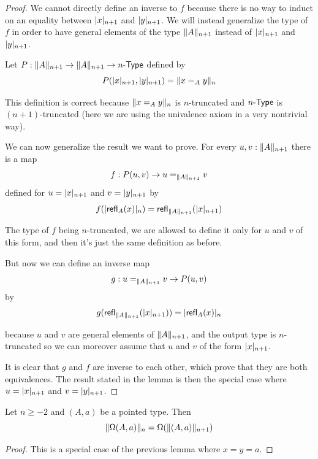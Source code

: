 \begin{proof}
  We cannot directly define an inverse to $f$ because there is no way to induct
  on an equality between $\tproj {n+1}x$ and $\tproj {n+1}y$. We will instead
  generalize the type of $f$ in order to have general elements of the type
  $\trunc{n+1}A$ instead of $\tproj {n+1}x$ and $\tproj {n+1}y$.

  Let $P:\trunc {n+1}A\to\trunc {n+1}A\to\typele{n}$ defined by
  \[P(\tproj {n+1}x,\tproj {n+1}y)=\trunc n{x=_Ay}\]

  This definition is correct because $\trunc n{x=_Ay}$ is $n$-truncated and
  $\typele{n}$ is $(n+1)$-truncated (here we are using the univalence axiom in a
  very nontrivial way).

  We can now generalize the result we want to prove. For every $u,v:\trunc{n+1}A$
  there is a map
  \[f:P(u,v)\to{}u=_{\trunc{n+1}A}v\]
  defined for $u=\tproj {n+1}x$ and $v=\tproj {n+1}y$ by
  \[f(\tproj n{\refl{A}(x)})=\refl{\trunc {n+1}A}(\tproj {n+1}x)\]

  The type of $f$ being $n$-truncated, we are allowed to define it only for $u$
  and $v$ of this form, and then it's just the same definition as before.

  But now we can define an inverse map
  \[g:u=_{\trunc{n+1}A}v\to{}P(u,v)\]
  by
  \[g(\refl{\trunc{n+1}A}(\tproj {n+1}x)) = \tproj n{\refl{A}(x)}\]

  because $u$ and $v$ are general elements of $\trunc{n+1}A$, and the output type
  is $n$-truncated so we can moreover assume that $u$ and $v$ of the form
  $\tproj {n+1}x$.

  It is clear that $g$ and $f$ are inverse to each other, which prove that they
  are both equivalences. The result stated in the lemma is then the special case
  where $u=\tproj {n+1}x$ and $v=\tproj {n+1}y$.
\end{proof}

\begin{cor}
  Let $n\ge-2$ and $(A,a)$ be a pointed type. Then
  \[\trunc n{\Omega(A,a)}=\Omega(\trunc{n+1}{(A,a)})\]
\end{cor}
\begin{proof}
  This is a special case of the previous lemma where $x=y=a$.
\end{proof}

